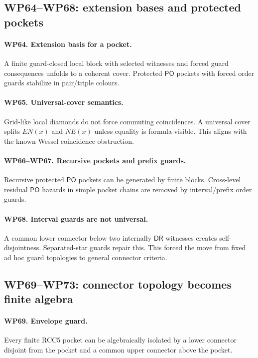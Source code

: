 \documentclass[11pt]{article}
\newcommand{\PO}{\mathsf{PO}}
\newcommand{\DR}{\mathsf{DR}}
\begin{document}
\subsection{WP64--WP68: extension bases and protected pockets}
\paragraph{WP64. Extension basis for a pocket.}
A finite guard-closed local block with selected witnesses and forced guard consequences unfolds to a coherent cover.  Protected $\PO$ pockets with forced order guards stabilize in pair/triple colours.

\paragraph{WP65. Universal-cover semantics.}
Grid-like local diamonds do not force commuting coincidences.  A universal cover splits $EN(x)$ and $NE(x)$ unless equality is formula-visible.  This aligns with the known Wessel coincidence obstruction.

\paragraph{WP66--WP67. Recursive pockets and prefix guards.}
Recursive protected $\PO$ pockets can be generated by finite blocks.  Cross-level residual $\PO$ hazards in simple pocket chains are removed by interval/prefix order guards.

\paragraph{WP68. Interval guards are not universal.}
A common lower connector below two internally $\DR$ witnesses creates self-disjointness.  Separated-star guards repair this.  This forced the move from fixed ad hoc guard topologies to general connector criteria.

\subsection{WP69--WP73: connector topology becomes finite algebra}
\paragraph{WP69. Envelope guard.}
Every finite RCC5 pocket can be algebraically isolated by a lower connector disjoint from the pocket and a common upper connector above the pocket.
\end{document}
